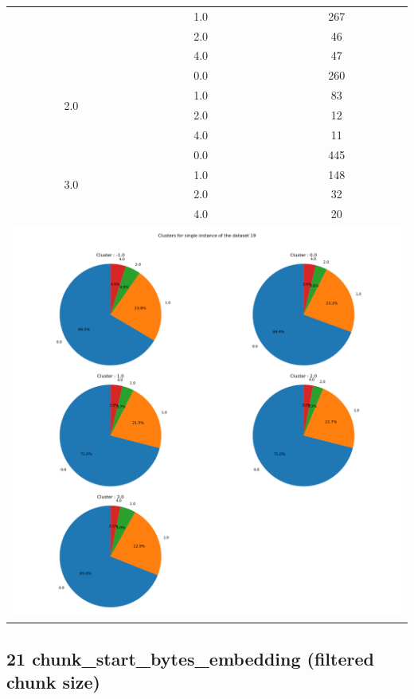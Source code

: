 \begin{longtable}{|c|c|c|c|c|}
& \multicolumn{2}{c|}{1.0} & \multicolumn{2}{c|}{267} \\
& \multicolumn{2}{c|}{2.0} & \multicolumn{2}{c|}{46} \\
& \multicolumn{2}{c|}{4.0} & \multicolumn{2}{c|}{47} \\
\hline
\multirow{4}{*}{2.0} & \multicolumn{2}{c|}{0.0} & \multicolumn{2}{c|}{260} \\
& \multicolumn{2}{c|}{1.0} & \multicolumn{2}{c|}{83} \\
& \multicolumn{2}{c|}{2.0} & \multicolumn{2}{c|}{12} \\
& \multicolumn{2}{c|}{4.0} & \multicolumn{2}{c|}{11} \\
\hline
\multirow{4}{*}{3.0} & \multicolumn{2}{c|}{0.0} & \multicolumn{2}{c|}{445} \\
& \multicolumn{2}{c|}{1.0} & \multicolumn{2}{c|}{148} \\
& \multicolumn{2}{c|}{2.0} & \multicolumn{2}{c|}{32} \\
& \multicolumn{2}{c|}{4.0} & \multicolumn{2}{c|}{20} \\
\hline
\multicolumn{5}{|c|}{\includegraphics[width=0.8\linewidth]{img/annexes/19/clustering_pie_charts/single instance.png}} \\
\end{longtable}


\subsection{21 chunk\_start\_bytes\_embedding (filtered chunk size)}

